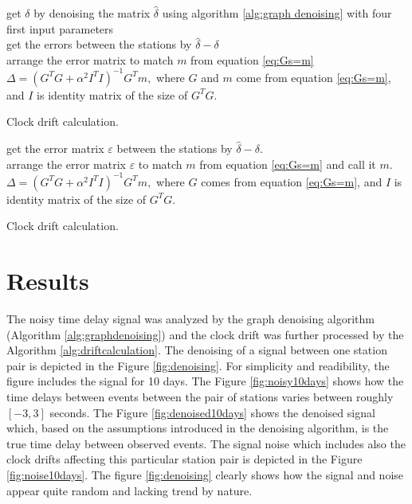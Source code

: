 \documentclass[12pt, sumlimits, intlimits]{article}
\begin{document}
\begin{algorithm}[H]
	get $\delta$ by denoising the matrix $\hat{\delta}$ using algorithm \ref{alg:graph denoising} with four first input parameters\\
	get the errors between the stations by $\hat{\delta} - \delta$\\
	arrange the error matrix to match $m$ from equation \ref{eq:Gs=m}\\
	$\Delta = (G^TG + \alpha^2I^TI)^{-1}G^Tm,$ where $G$ and $m$ come from equation \ref{eq:Gs=m}, and $I$ is identity matrix of the size of $G^TG$. 
	\caption{Clock drift calculation.}
 	\label{alg:delaycalculation}
\end{algorithm}
\fi
\begin{algorithm}[H]
	get the error matrix $\varepsilon$ between the stations by $\hat{\delta} - \delta$.\\
	arrange the error matrix $\varepsilon$ to match $m$ from equation  \ref{eq:Gs=m} and call it $m$.\\
	$\Delta = (G^TG + \alpha^2I^TI)^{-1}G^Tm,$ where $G$ comes from equation \ref{eq:Gs=m}, and $I$ is identity matrix of the size of $G^TG$. 
	\caption{Clock drift calculation.}
	\label{alg:driftcalculation}
\end{algorithm}

\section{Results}

The noisy time delay signal was analyzed by the graph denoising algorithm (Algorithm \ref{alg:graphdenoising}) and the clock drift was further processed by the Algorithm \ref{alg:driftcalculation}. The denoising of a signal between one station pair is depicted in the Figure \ref{fig:denoising}. For simplicity and readibility, the figure includes the signal for 10 days. The Figure \ref{fig:noisy10days} shows how the time delays between events between the pair of stations varies between roughly $[-3,3]$ seconds. The Figure \ref{fig:denoised10days} shows the denoised signal which, based on the assumptions introduced in the denoising algorithm, is the true time delay between observed events. The signal noise which includes also the clock drifts affecting this particular station pair is depicted in the Figure \ref{fig:noise10days}.  The figure \ref{fig:denoising} clearly shows how the signal and noise appear quite random and lacking trend by nature. 
\end{document}
